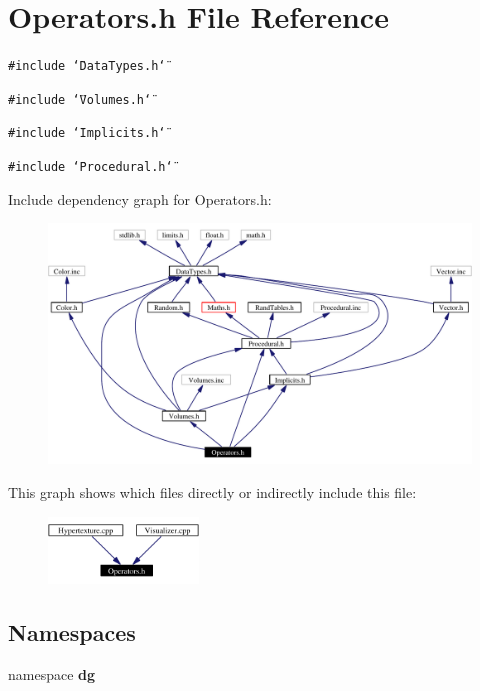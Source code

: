 \section{Operators.h File Reference}
\label{Operators_8h}
{\tt \#include \char`\"{}Data\-Types.h\char`\"{}}\par
{\tt \#include \char`\"{}Volumes.h\char`\"{}}\par
{\tt \#include \char`\"{}Implicits.h\char`\"{}}\par
{\tt \#include \char`\"{}Procedural.h\char`\"{}}\par


Include dependency graph for Operators.h:\begin{figure}[H]
\begin{center}
\leavevmode
\includegraphics[width=321pt]{Operators_8h__incl}
\end{center}
\end{figure}


This graph shows which files directly or indirectly include this file:\begin{figure}[H]
\begin{center}
\leavevmode
\includegraphics[width=113pt]{Operators_8h__dep__incl}
\end{center}
\end{figure}
\subsection*{Namespaces}
\begin{CompactItemize}
\item 
namespace {\bf dg}
\end{CompactItemize}
